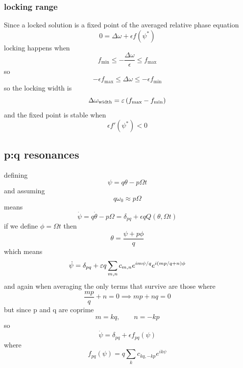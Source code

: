 \subsubsection{locking range}
Since a locked solution is a fixed point of the averaged relative phase equation 
\begin{equation}
    0=\Delta\omega + \epsilon f(\psi^*)
\end{equation}
locking happens when 
\begin{equation}
    f_{\min} \leq -\frac{\Delta\omega}{\epsilon}\leq f_{\max}
\end{equation}
so 
\begin{equation}
    -\epsilon f_{\max}\leq \Delta\omega \leq -\epsilon f_{\min}
\end{equation}
so the locking width is 
\begin{equation}
    \Delta\omega_{\text{width}} = \varepsilon\left(f_{\max}-f_{\min}\right)
\end{equation}
and the fixed point is stable when 
\begin{equation}
    \epsilon f'(\psi^*)<0
\end{equation}
\subsection{p:q resonances}
defining 
\begin{equation}
    \psi = q\theta-p\Omega t
\end{equation}
and assuming 
\begin{equation}
    q\omega_0 \approx p\Omega
\end{equation}
means 
\begin{equation}
    \dot{\psi}=q\dot{\theta}-p\Omega=\delta_{pq}+\epsilon qQ(\theta,\Omega t)
\end{equation}
if we define \(\phi=\Omega t\) then 
\begin{equation}
    \theta = \frac{\psi+p\phi}{q}
\end{equation}
which means 
\begin{equation}
    \dot{\psi}=\delta_{pq}+\varepsilon q\sum_{m,n}c_{m,n}e^{im\psi/q}e^{i\left(mp/q+n\right)\phi}
\end{equation}
and again when averaging the only terms that survive are those where 
\begin{equation}
    \frac{mp}{q}+n=0 \implies mp+nq=0
\end{equation}
but since p and q are coprime
\begin{equation}
    m=kq,\qquad n=-kp
\end{equation}
so 
\begin{equation}
    \dot{\psi}=\delta_{pq}+\epsilon f_{pq}(\psi)
\end{equation}
where 
\begin{equation}
    f_{pq}(\psi)=q\sum_k c_{kq,-kp}e^{ik\psi}
\end{equation}
